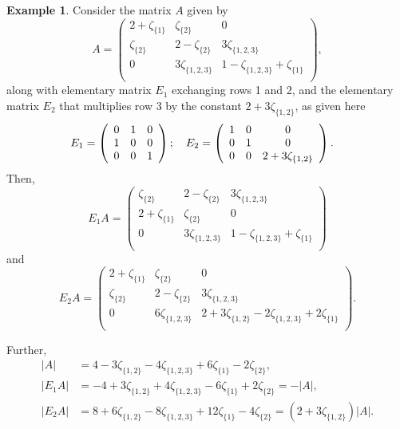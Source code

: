 \documentclass{article}
\theoremstyle{definition}
\newtheorem{example}[theorem]{Example}
\numberwithin{equation}{section}
\begin{document}
\begin{example}
Consider the matrix $A$ given by 
\begin{equation*}
A=\left(
\begin{array}{ccc}
 2+\zeta _{\{1\}}& \zeta _{\{2\}} & 0 \\
 \zeta _{\{2\}} & 2-\zeta _{\{2\}} & 3 \zeta _{\{1,2,3\}} \\
 0 & 3 \zeta _{\{1,2,3\}} & 1-\zeta _{\{1,2,3\}}+\zeta _{\{1\}} \\
\end{array}
\right),
\end{equation*}
along with elementary matrix $E_1$ exchanging rows 1 and 2, and the elementary matrix $E_2$ that multiplies row 3 by the constant $2+3\zeta_{\{1,2\}}$, as given here
\begin{align*}
E_1&=\left(
\begin{array}{ccc}
 0 & 1 & 0 \\
 1 & 0 & 0 \\
 0 & 0 & 1 \\
\end{array}
\right);\hskip10pt 
E_2=\left(
\begin{array}{ccc}
 1 & 0 & 0 \\
 0 & 1 & 0 \\
 0 & 0 & 2+3 \zeta _{\{1,2\}} \\
\end{array}
\right).
\end{align*}
Then,
\begin{equation*}
E_1 A=\left(
\begin{array}{ccc}
 \zeta _{\{2\}} & 2-\zeta _{\{2\}} & 3 \zeta _{\{1,2,3\}} \\
 2+\zeta _{\{1\}} & \zeta _{\{2\}} & 0 \\
 0 & 3 \zeta _{\{1,2,3\}} & 1-\zeta _{\{1,2,3\}}+\zeta _{\{1\}} \\
\end{array}
\right)
\end{equation*}
and 
\begin{equation*}
E_2 A=\left(
\begin{array}{ccc}
 2+\zeta _{\{1\}} & \zeta _{\{2\}} & 0 \\
 \zeta _{\{2\}} & 2-\zeta _{\{2\}} & 3 \zeta _{\{1,2,3\}} \\
 0 & 6 \zeta _{\{1,2,3\}} & 2+3 \zeta _{\{1,2\}}-2 \zeta _{\{1,2,3\}}+2 \zeta _{\{1\}} \\
\end{array}
\right).
\end{equation*}

Further,  \begin{align*}
|A|&=4-3 \zeta _{\{1,2\}}-4 \zeta _{\{1,2,3\}}+6 \zeta _{\{1\}}-2 \zeta _{\{2\}},\\
|E_1 A|&=-4+3 \zeta _{\{1,2\}}+4 \zeta _{\{1,2,3\}}-6 \zeta _{\{1\}}+2 \zeta _{\{2\}}=-|A|,\\
|E_2 A|&=8+6 \zeta _{\{1,2\}}-8 \zeta _{\{1,2,3\}}+12 \zeta _{\{1\}}-4 \zeta _{\{2\}}=(2+3 \zeta _{\{1,2\}})|A|.
\end{align*}
\end{example}
\end{document}
